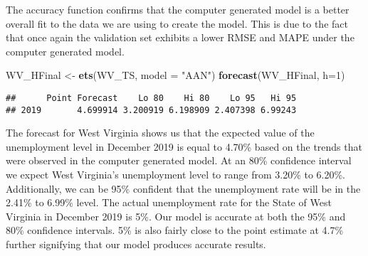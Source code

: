 \documentclass[
]{article}
\newenvironment{Shaded}{\begin{snugshade}}{\end{snugshade}}
\newcommand{\DataTypeTok}[1]{\textcolor[rgb]{0.13,0.29,0.53}{#1}}
\newcommand{\DecValTok}[1]{\textcolor[rgb]{0.00,0.00,0.81}{#1}}
\newcommand{\KeywordTok}[1]{\textcolor[rgb]{0.13,0.29,0.53}{\textbf{#1}}}
\newcommand{\NormalTok}[1]{#1}
\newcommand{\StringTok}[1]{\textcolor[rgb]{0.31,0.60,0.02}{#1}}
\begin{document}
The accuracy function confirms that the computer generated model is a
better overall fit to the data we are using to create the model. This is
due to the fact that once again the validation set exhibits a lower RMSE
and MAPE under the computer generated model.

\begin{Shaded}
\begin{Highlighting}[]
\NormalTok{WV_HFinal <-}\StringTok{ }\KeywordTok{ets}\NormalTok{(WV_TS, }\DataTypeTok{model =} \StringTok{"AAN"}\NormalTok{)}
\KeywordTok{forecast}\NormalTok{(WV_HFinal, }\DataTypeTok{h=}\DecValTok{1}\NormalTok{)}
\end{Highlighting}
\end{Shaded}

\begin{verbatim}
##      Point Forecast    Lo 80    Hi 80    Lo 95   Hi 95
## 2019       4.699914 3.200919 6.198909 2.407398 6.99243
\end{verbatim}

The forecast for West Virginia shows us that the expected value of the
unemployment level in December 2019 is equal to 4.70\% based on the
trends that were observed in the computer generated model. At an 80\%
confidence interval we expect West Virginia's unemployment level to
range from 3.20\% to 6.20\%. Additionally, we can be 95\% confident that
the unemployment rate will be in the 2.41\% to 6.99\% level. The actual
unemployment rate for the State of West Virginia in December 2019 is
5\%. Our model is accurate at both the 95\% and 80\% confidence
intervals. 5\% is also fairly close to the point estimate at 4.7\%
further signifying that our model produces accurate results.
\end{document}
